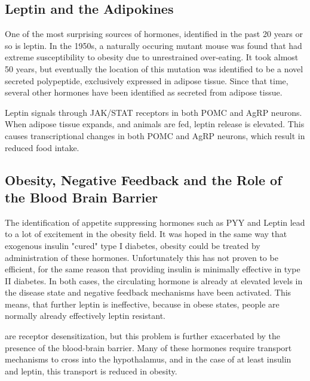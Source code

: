 \documentclass{tufte-handout}
\begin{document}
\subsection{Leptin and the Adipokines}

One of the most surprising sources of hormones, identified in the past 20 years or so is leptin.  In the 1950s, a naturally occuring mutant mouse was found that had extreme susceptibility to obesity due to unrestrained over-eating\cite{Ingalls1950}.  It took almost 50 years, but eventually the location of this mutation was identified to be a novel secreted polypeptide, exclusively expressed in adipose tissue\cite{Zhang1994}.  Since that time, several other hormones have been identified as secreted from adipose tissue.

  Leptin signals through JAK/STAT receptors in both POMC and AgRP neurons.  When adipose tissue expands, and animals are fed, leptin release is elevated.  This causes transcriptional changes in both POMC and AgRP neurons, which result in reduced food intake.

\subsection{Obesity, Negative Feedback and the Role of the Blood Brain Barrier}

The identification of appetite suppressing hormones such as PYY and Leptin lead to a lot of excitement in the obesity field.  It was hoped in the same way that exogenous insulin "cured" type I diabetes, obesity could be treated by administration of these hormones.  Unfortunately this has not proven to be efficient, for the same reason that providing insulin is minimally effective in type II diabetes.  In both cases, the circulating hormone is already at elevated levels in the disease state and negative feedback mechanisms have been activated.  This means, that further leptin is ineffective, because in obese states, people are normally already effectively leptin resistant.

 are receptor desensitization, but this problem is further exacerbated by the presence of the blood-brain barrier.  Many of these hormones require transport mechanisms to cross into the hypothalamus, and in the case of at least insulin and leptin, this transport is reduced in obesity.
\end{document}

